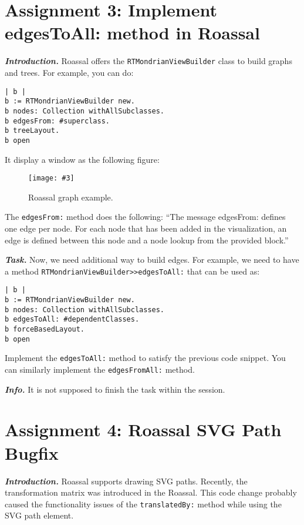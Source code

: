 \documentclass[table,a4paper]{article}
\newcommand{\myparagraph}[1]{\vspace{0.3em}\noindent \textbf{\textit{#1.}}}
\newcommand{\ct}[1]{\texttt{#1}}
\newcommand{\fig}[4]{
	\begin{figure}[#1]
		\centering
		\texttt{[image: \#3]}
		\caption{\label{fig:#3}#4}
	\end{figure}}
\begin{document}
\clearpage{}

\section{Assignment 3: Implement edgesToAll: method in Roassal}
\label{sec:a3}

\myparagraph{Introduction} Roassal offers the \ct{RTMondrianViewBuilder} class to build graphs and trees. For example, you can do:

\begin{lstlisting}
| b |
b := RTMondrianViewBuilder new.
b nodes: Collection withAllSubclasses.
b edgesFrom: #superclass.
b treeLayout.
b open
\end{lstlisting}

It display a window as the following figure: 

\fig{h}{1}{roassal-graph}{Roassal graph example.}

The \ct{edgesFrom:} method does the following: ``The message edgesFrom: defines one edge per node. For each node that has been added in the visualization, an edge is defined between this node and a node lookup from the provided block.''

\myparagraph{Task} Now, we need additional way to build edges. For example, we need to have a method \ct{RTMondrianViewBuilder>>edgesToAll:} that can be used as:

\begin{lstlisting}
| b |
b := RTMondrianViewBuilder new.
b nodes: Collection withAllSubclasses.
b edgesToAll: #dependentClasses.
b forceBasedLayout.
b open
\end{lstlisting}

Implement the \ct{edgesToAll:} method to satisfy the previous code snippet. You can similarly implement the \ct{edgesFromAll:} method.

\myparagraph{Info} It is not supposed to finish the task within the session.

\clearpage{}

\section{Assignment 4: Roassal SVG Path Bugfix}
\label{sec:a4}

\myparagraph{Introduction} Roassal supports drawing SVG paths. Recently, the transformation matrix was introduced in the Roassal. This code change probably caused the functionality issues of the \ct{translatedBy:} method while using the SVG path element.
\end{document}
